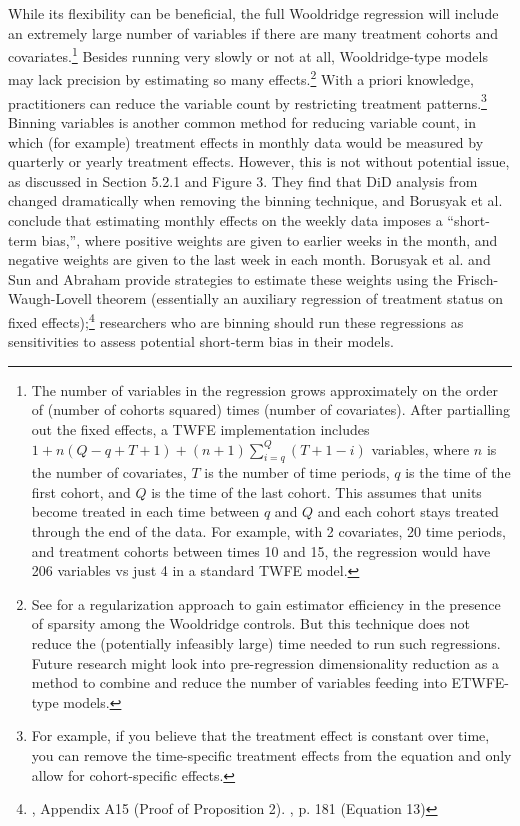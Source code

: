 \documentclass[12pt]{article}
\begin{document}
While its flexibility can be beneficial, the full Wooldridge regression will include an extremely large number of variables if there are many treatment cohorts and covariates.\footnote{The number of variables in the regression grows approximately on the order of (number of cohorts squared) times (number of covariates). After partialling out the fixed effects, a TWFE implementation includes $1 + n(Q-q+T+1) + (n+1) \sum_{i=q}^Q(T+1-i)$ variables, where $n$ is the number of covariates, $T$ is the number of time periods, $q$ is the time of the first cohort, and $Q$ is the time of the last cohort. This assumes that units become treated in each time between $q$ and $Q$ and each cohort stays treated through the end of the data. For example, with 2 covariates, 20 time periods, and treatment cohorts between times 10 and 15, the regression would have 206 variables vs just 4 in a standard TWFE model.}  Besides running very slowly or not at all, Wooldridge-type models may lack precision by estimating so many effects.\footnote{See \citet{faletto2023a} for a regularization approach to gain estimator efficiency in the presence of sparsity among the Wooldridge controls. But this technique does not reduce the (potentially infeasibly large) time needed to run such regressions. Future research might look into pre-regression dimensionality reduction as a method to combine and reduce the number of variables feeding into ETWFE-type models.}  With a priori knowledge, practitioners can reduce the variable count by restricting treatment patterns.\footnote{For example, if you believe that the treatment effect is constant over time, you can remove the time-specific treatment effects from the equation and only allow for cohort-specific effects.}  Binning variables is another common method for reducing variable count, in which (for example) treatment effects in monthly data would be measured by quarterly or yearly treatment effects. However, this is not without potential issue, as discussed in \citet{borusyak2024revisiting} Section 5.2.1 and Figure 3. They find that DiD analysis from \citet{broda2014} changed dramatically when removing the binning technique, and Borusyak et al. conclude that  estimating monthly effects on the weekly data imposes a “short-term bias,”, where positive weights are given to earlier weeks in the month, and negative weights are given to the last week in each month. Borusyak et al. and Sun and Abraham provide strategies to estimate these weights using the Frisch-Waugh-Lovell theorem (essentially an auxiliary regression of treatment status on fixed effects);\footnote{\citet{borusyak2024revisiting}, Appendix A15 (Proof of Proposition 2). \citet{sunabr2021a}, p. 181 (Equation 13)}  researchers who are binning should run these regressions as sensitivities to assess potential short-term bias in their models.
\end{document}
